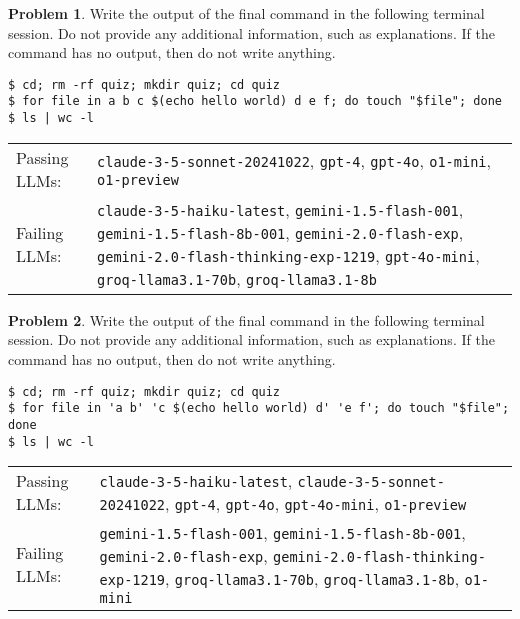 \documentclass[10pt]{article}
\theoremstyle{definition}
\newtheorem{problem}{Problem}
\begin{document}
\begin{samepage}

\begin{problem}
Write the output of the final command in the following terminal session.
Do not provide any additional information,
such as explanations.
If the command has no output,
then do not write anything.

\end{problem}
\begin{lstlisting}
$ cd; rm -rf quiz; mkdir quiz; cd quiz
$ for file in a b c $(echo hello world) d e f; do touch "$file"; done
$ ls | wc -l
\end{lstlisting}


\noindent
\begin{tabular}{p{1.0in}L{5in}}
Passing LLMs: & {\lstinline$claude-3-5-sonnet-20241022$}, {\lstinline$gpt-4$}, {\lstinline$gpt-4o$}, {\lstinline$o1-mini$}, {\lstinline$o1-preview$} \\
Failing LLMs: & {\lstinline$claude-3-5-haiku-latest$}, {\lstinline$gemini-1.5-flash-001$}, {\lstinline$gemini-1.5-flash-8b-001$}, {\lstinline$gemini-2.0-flash-exp$}, {\lstinline$gemini-2.0-flash-thinking-exp-1219$}, {\lstinline$gpt-4o-mini$}, {\lstinline$groq-llama3.1-70b$}, {\lstinline$groq-llama3.1-8b$} \\
\end{tabular}

\end{samepage}
\begin{samepage}

\begin{problem}
Write the output of the final command in the following terminal session.
Do not provide any additional information,
such as explanations.
If the command has no output,
then do not write anything.

\end{problem}
\begin{lstlisting}
$ cd; rm -rf quiz; mkdir quiz; cd quiz
$ for file in 'a b' 'c $(echo hello world) d' 'e f'; do touch "$file"; done
$ ls | wc -l
\end{lstlisting}


\noindent
\begin{tabular}{p{1.0in}L{5in}}
Passing LLMs: & {\lstinline$claude-3-5-haiku-latest$}, {\lstinline$claude-3-5-sonnet-20241022$}, {\lstinline$gpt-4$}, {\lstinline$gpt-4o$}, {\lstinline$gpt-4o-mini$}, {\lstinline$o1-preview$} \\
Failing LLMs: & {\lstinline$gemini-1.5-flash-001$}, {\lstinline$gemini-1.5-flash-8b-001$}, {\lstinline$gemini-2.0-flash-exp$}, {\lstinline$gemini-2.0-flash-thinking-exp-1219$}, {\lstinline$groq-llama3.1-70b$}, {\lstinline$groq-llama3.1-8b$}, {\lstinline$o1-mini$} \\
\end{tabular}

\end{samepage}
\end{document}
